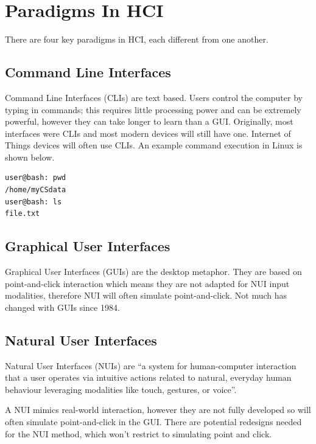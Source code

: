 \section*{Paradigms In HCI}
There are four key paradigms in HCI, each different from one another.
\subsection*{Command Line Interfaces}
Command Line Interfaces (CLIs) are text based. Users control the computer by typing in commands; this requires little processing power and can be extremely powerful, however they can take longer to learn than a GUI. Originally, most interfaces were CLIs and most modern devices will still have one. Internet of Things devices will often use CLIs. An example command execution in Linux is shown below.
\begin{verbatim}
user@bash: pwd
/home/myCSdata
user@bash: ls
file.txt
\end{verbatim}

\subsection*{Graphical User Interfaces}
Graphical User Interfaces (GUIs) are the desktop metaphor. They are based on point-and-click interaction which means they are not adapted for NUI input modalities, therefore NUI will often simulate point-and-click. Not much has changed with GUIs since 1984. 

\subsection*{Natural User Interfaces}
Natural User Interfaces (NUIs) are ``a system for human-computer interaction that a user operates via intuitive actions related to natural, everyday human behaviour leveraging modalities like touch, gestures, or voice''. 

A NUI mimics real-world interaction, however they are not fully developed so will often simulate point-and-click in the GUI. There are potential redesigns needed for the NUI method, which won't restrict to simulating point and click. 

